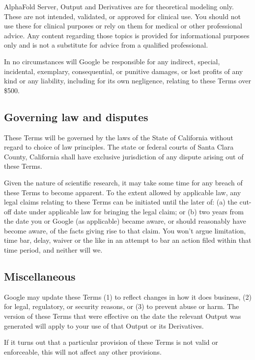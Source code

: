 \documentclass[
]{article}
\begin{document}
AlphaFold Server, Output and Derivatives are for theoretical modeling
only. These are not intended, validated, or approved for clinical use.
You should not use these for clinical purposes or rely on them for
medical or other professional advice. Any content regarding those topics
is provided for informational purposes only and is not a substitute for
advice from a qualified professional.

In no circumstances will Google be responsible for any indirect,
special, incidental, exemplary, consequential, or punitive damages, or
lost profits of any kind or any liability, including for its own
negligence, relating to these Terms over \$500.

\subsection{Governing law and
disputes}\label{governing-law-and-disputes}

These Terms will be governed by the laws of the State of California
without regard to choice of law principles. The state or federal courts
of Santa Clara County, California shall have exclusive jurisdiction of
any dispute arising out of these Terms.

Given the nature of scientific research, it may take some time for any
breach of these Terms to become apparent. To the extent allowed by
applicable law, any legal claims relating to these Terms can be
initiated until the later of: (a) the cut-off date under applicable law
for bringing the legal claim; or (b) two years from the date you or
Google (as applicable) became aware, or should reasonably have become
aware, of the facts giving rise to that claim. You won't argue
limitation, time bar, delay, waiver or the like in an attempt to bar an
action filed within that time period, and neither will we.

\subsection{Miscellaneous}\label{miscellaneous}

Google may update these Terms (1) to reflect changes in how it does
business, (2) for legal, regulatory, or security reasons, or (3) to
prevent abuse or harm. The version of these Terms that were effective on
the date the relevant Output was generated will apply to your use of
that Output or its Derivatives.

If it turns out that a particular provision of these Terms is not valid
or enforceable, this will not affect any other provisions.
\end{document}
